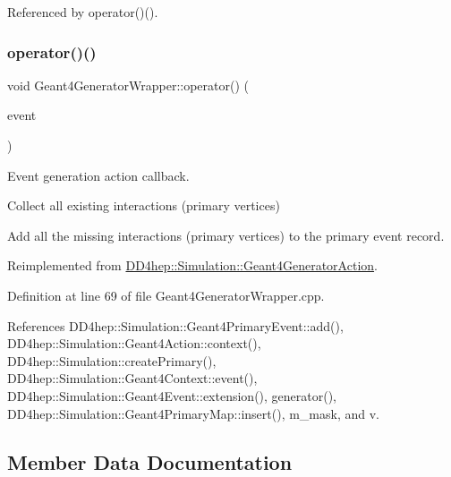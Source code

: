 Referenced by operator()().

\hypertarget{class_d_d4hep_1_1_simulation_1_1_geant4_generator_wrapper_a073ee3177fe624c0caf2bb5068d9d865}{}\label{class_d_d4hep_1_1_simulation_1_1_geant4_generator_wrapper_a073ee3177fe624c0caf2bb5068d9d865} 
\subsubsection{\texorpdfstring{operator()()}{operator()()}}
{\footnotesize\ttfamily void Geant4\+Generator\+Wrapper\+::operator() (\begin{DoxyParamCaption}\item[{G4\+Event $\ast$}]{event }\end{DoxyParamCaption})\hspace{0.3cm}{\ttfamily [virtual]}}



Event generation action callback. 

Collect all existing interactions (primary vertices)

Add all the missing interactions (primary vertices) to the primary event record. 

Reimplemented from \hyperlink{class_d_d4hep_1_1_simulation_1_1_geant4_generator_action_ac5a1d2335a19e3f9d555081199e01801}{D\+D4hep\+::\+Simulation\+::\+Geant4\+Generator\+Action}.



Definition at line 69 of file Geant4\+Generator\+Wrapper.\+cpp.



References D\+D4hep\+::\+Simulation\+::\+Geant4\+Primary\+Event\+::add(), D\+D4hep\+::\+Simulation\+::\+Geant4\+Action\+::context(), D\+D4hep\+::\+Simulation\+::create\+Primary(), D\+D4hep\+::\+Simulation\+::\+Geant4\+Context\+::event(), D\+D4hep\+::\+Simulation\+::\+Geant4\+Event\+::extension(), generator(), D\+D4hep\+::\+Simulation\+::\+Geant4\+Primary\+Map\+::insert(), m\+\_\+mask, and v.



\subsection{Member Data Documentation}
\hypertarget{class_d_d4hep_1_1_simulation_1_1_geant4_generator_wrapper_a53d604d0f487a3be2edbe9670d0d4f15}{}\label{class_d_d4hep_1_1_simulation_1_1_geant4_generator_wrapper_a53d604d0f487a3be2edbe9670d0d4f15} 
